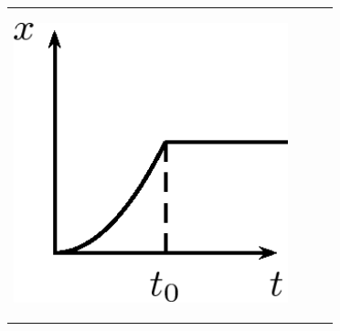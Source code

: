 \begin{enumerate}[noitemsep, label=\textbf{\arabic*}. ]
    
    \setlength\mytableroom{\mytablewidth}
    \addtolength\mytableroom{-\mytablespace}
    
    \setlength\myfixedwidth{0pt}
    \setlength\mystarwidth{\mytableroom}
        \addtolength\mystarwidth{-\myfixedwidth}
        \divide{}
        
    
            
    
        \begin{center}
      
      \label{m38796*id81647}
      
    \noindent
      \tablelasttail{}
      \begin{xtabular*}{\mytablewidth}[t]{|p{10\mystarwidth}|p{10\mystarwidth}|p{10\mystarwidth}|p{10\mystarwidth}|}\hline
    
    
        
    \setcounter{subfigure}{0}

\label{m38796*id81654}
    \begin{center}
    \label{m38796*id81654!!!underscore!!!media}\label{m38796*id81654!!!underscore!!!printimage}\includegraphics[width=300px]{col11305.imgs/m38796_PG10C2_047.png} %
        

\end{center}
\end{xtabular*}
\end{center}
\end{enumerate}
